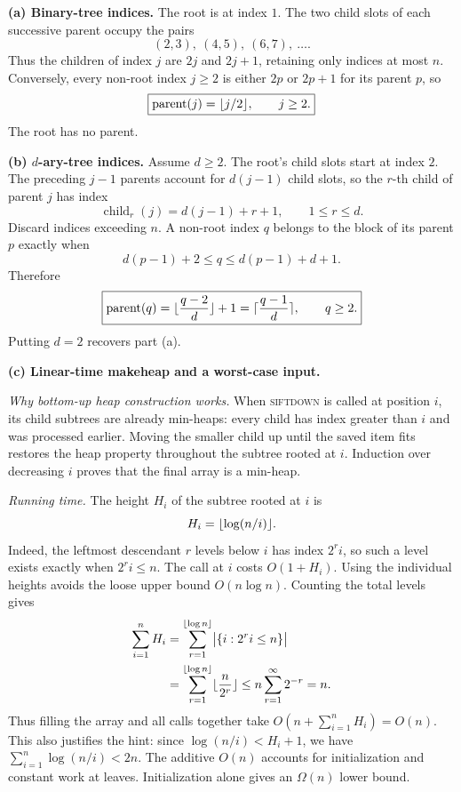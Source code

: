 \documentclass[11pt]{article}
\DeclarePairedDelimiter{\floor}{\lfloor}{\rfloor}
\DeclarePairedDelimiter{\ceil}{\lceil}{\rceil}
\begin{document}
\textbf{(a) Binary-tree indices.}
The root is at index $1$. The two child slots of each successive parent
occupy the pairs
\[
 (2,3),\ (4,5),\ (6,7),\ \ldots.
\]
Thus the children of index $j$ are $2j$ and $2j+1$, retaining only
indices at most $n$. Conversely, every non-root index $j\ge2$ is
either $2p$ or $2p+1$ for its parent $p$, so
\[
  \boxed{\operatorname{parent}(j)=\floor{j/2},\qquad j\ge2.}
\]
The root has no parent.

\textbf{(b) $d$-ary-tree indices.}
Assume $d\ge2$. The root's child slots start at index $2$.
The preceding $j-1$ parents account for $d(j-1)$ child slots, so the
$r$-th child of parent $j$ has index
\[
  \boxed{\operatorname{child}_r(j)=d(j-1)+r+1,\qquad 1\le r\le d.}
\]
Discard indices exceeding $n$.
A non-root index $q$ belongs to the block of its parent $p$ exactly when
\[
 d(p-1)+2\le q\le d(p-1)+d+1.
\]
Therefore
\[
  \boxed{\operatorname{parent}(q)=
    \floor{\frac{q-2}{d}}+1
    =\ceil{\frac{q-1}{d}},\qquad q\ge2.}
\]
Putting $d=2$ recovers part (a).

\textbf{(c) Linear-time makeheap and a worst-case input.}

\emph{Why bottom-up heap construction works.}
When \textsc{siftdown} is called at position $i$, its child subtrees are
already min-heaps: every child has index greater than $i$ and was
processed earlier. Moving the smaller child up until the saved item
fits restores the heap property throughout the subtree rooted at $i$.
Induction over decreasing $i$ proves that the final array is a min-heap.

\emph{Running time.}
The height $H_i$ of the subtree rooted at $i$ is
\[
 H_i=\floor{\log(n/i)}.
\]
Indeed, the leftmost descendant $r$ levels below $i$ has index $2^r i$,
so such a level exists exactly when $2^r i\le n$.
The call at $i$ costs $O(1+H_i)$. Using the individual heights avoids
the loose upper bound $O(n\log n)$. Counting the total levels gives
\[
 \begin{aligned}
 \sum_{i=1}^n H_i
 &=\sum_{r=1}^{\floor{\log n}}
       \bigl|\{i:2^r i\le n\}\bigr|\\
 &=\sum_{r=1}^{\floor{\log n}}\floor{\frac{n}{2^r}}
 \le n\sum_{r=1}^{\infty}2^{-r}=n.
 \end{aligned}
\]
Thus filling the array and all calls together take
$O(n+\sum_{i=1}^n H_i)=\boxed{O(n)}$.
This also justifies the hint: since
$\log(n/i)<H_i+1$, we have $\sum_{i=1}^n\log(n/i)<2n$.
The additive $O(n)$ accounts for initialization and constant work at
leaves. Initialization alone gives an $\Omega(n)$ lower bound.
\end{document}
